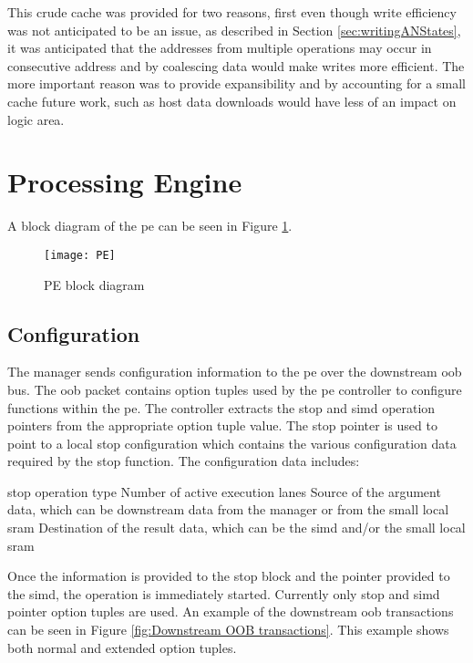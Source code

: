 This crude cache was provided for two reasons, first even though write efficiency was not anticipated to be an issue, as described in Section \ref{sec:writingANStates}, it was anticipated that the addresses from multiple operations may occur in consecutive address and by coalescing data would make writes more efficient.
The more important reason was to provide expansibility and by accounting for a small cache future work, such as host data downloads would have less of an impact on logic area.


\section{Processing Engine}
\label{sec:pe}

A block diagram of the \ac{pe} can be seen in Figure \ref{fig:PE block diagram}.
\begin{figure}[h]
\centering
\captionsetup{justification=centering}
\captionsetup{width=.9\linewidth}
\centerline{
\mbox{\texttt{[image: PE]}}
}
\center\caption{PE block diagram}
\label{fig:PE block diagram}
\end{figure}

\subsection{Configuration}
\label{sec:peConfiguration}

The manager sends configuration information to the \ac{pe} over the downstream \ac{oob} bus.
The \ac{oob} packet contains option tuples used by the \ac{pe} controller to configure functions within the \ac{pe}.
The controller extracts the \ac{stop} and \ac{simd} operation pointers from the appropriate option tuple value.
The \ac{stop} pointer is used to point to a local \ac{stop} configuration which contains the various configuration data required by the \ac{stop} function.
The configuration data includes:
\begin{outline}
    \1 \ac{stop} operation type
    \1 Number of active execution lanes
    \1 Source of the argument data, which can be downstream data from the manager or from the small local \ac{sram}
    \1 Destination of the result data, which can be the \ac{simd} and/or the small local \ac{sram}
\end{outline}
Once the information is provided to the \ac{stop} block and the pointer provided to the \ac{simd}, the operation is immediately started.
Currently only \ac{stop} and \ac{simd} pointer option tuples are used.
An example of the downstream \ac{oob} transactions can be seen in Figure \ref{fig:Downstream OOB transactions}. This example shows both normal and extended option tuples.

